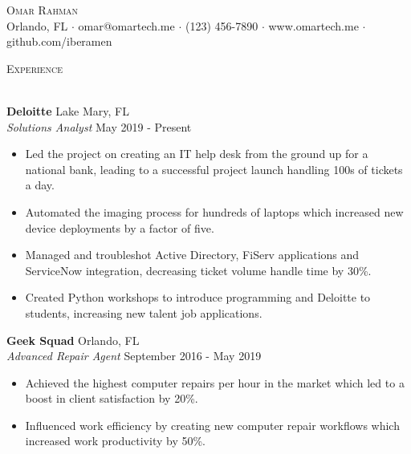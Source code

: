 \documentclass[a4paper]{article}
\newcommand{\lineunder} {
    \vspace*{-8pt} \\
    \hspace*{-18pt} \hrulefill \\
}
\newcommand{\header} [1] {
    {\hspace*{-18pt}\vspace*{6pt} \textsc{#1}}
    \vspace*{-6pt} \lineunder
}
\begin{document}
\vspace*{-40pt}

\vspace*{-10pt}
\begin{center}
	{\Huge \scshape {Omar Rahman}}\\
	Orlando, FL $\cdot$ omar@omartech.me $\cdot$ (123) 456-7890 $\cdot$ www.omartech.me $\cdot$ github.com/iberamen\\
\end{center}


\header{Experience}
\vspace{1mm}

\textbf{Deloitte} \hfill Lake Mary, FL\\
\textit{Solutions Analyst} \hfill May 2019 - Present\\
\vspace{-1mm}
\begin{itemize} \itemsep 1pt
	\item Led the project on creating an IT help desk from the ground up for a national bank, leading to a successful project launch handling 100s of tickets a day.
	\item Automated the imaging process for hundreds of laptops which increased new device deployments by a factor of five.
	\item Managed and troubleshot Active Directory, FiServ applications and ServiceNow integration, decreasing ticket volume handle time by 30\%.
	\item Created Python workshops to introduce programming and Deloitte to students, increasing new talent job applications.
\end{itemize}

\textbf{Geek Squad} \hfill Orlando, FL\\
\textit{Advanced Repair Agent} \hfill September 2016 - May 2019\\
\vspace{-1mm}
\begin{itemize} \itemsep 1pt
	\item Achieved the highest computer repairs per hour in the market which led to a boost in client satisfaction by 20\%.
	\item Influenced work efficiency by creating new computer repair workflows which increased work productivity by 50\%.
\end{itemize}
\end{document}

